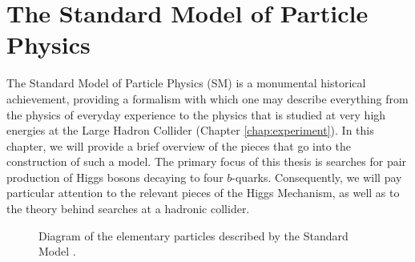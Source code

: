 \chapter{The Standard Model of Particle Physics}
\label{chap:intro-SM}

The Standard Model of Particle Physics (SM) is a monumental historical achievement, providing a 
formalism with which one may describe everything from the physics of everyday experience to the 
physics that is studied at very high energies at the Large Hadron Collider (Chapter \ref{chap:experiment}). 
In this chapter, we will provide a brief overview of the pieces that go into the 
construction of such a model. The primary focus of this thesis is searches for pair production of 
Higgs bosons decaying to four $b$-quarks. Consequently, we will pay particular attention to the 
relevant pieces of the Higgs Mechanism, as well as to the theory behind searches at a hadronic collider.

\begin{figure}[ht]
  \centering
  \caption{\label{fig:SM-fig} Diagram of the elementary particles described by the Standard Model \cite{SM-figure}.
  }
\end{figure}

